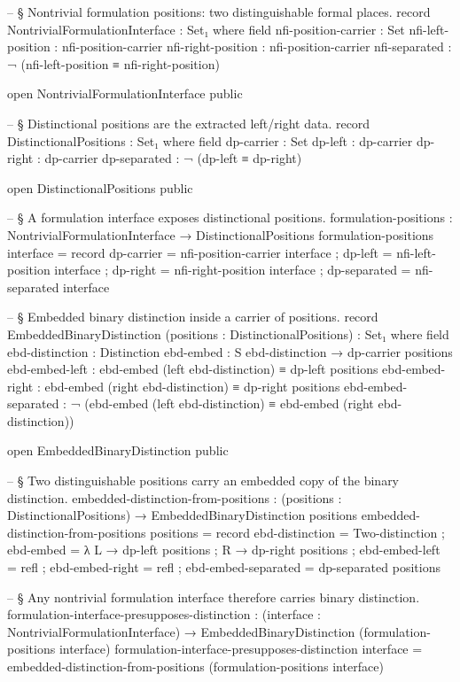 \documentclass[11pt]{article}
\begin{document}
\begin{code}
-- § Nontrivial formulation positions: two distinguishable formal places.
record NontrivialFormulationInterface : Set₁ where
  field
    nfi-position-carrier : Set
    nfi-left-position    : nfi-position-carrier
    nfi-right-position   : nfi-position-carrier
    nfi-separated        : ¬ (nfi-left-position ≡ nfi-right-position)

open NontrivialFormulationInterface public

-- § Distinctional positions are the extracted left/right data.
record DistinctionalPositions : Set₁ where
  field
    dp-carrier   : Set
    dp-left      : dp-carrier
    dp-right     : dp-carrier
    dp-separated : ¬ (dp-left ≡ dp-right)

open DistinctionalPositions public

-- § A formulation interface exposes distinctional positions.
formulation-positions : NontrivialFormulationInterface → DistinctionalPositions
formulation-positions interface = record
  { dp-carrier   = nfi-position-carrier interface
  ; dp-left      = nfi-left-position interface
  ; dp-right     = nfi-right-position interface
  ; dp-separated = nfi-separated interface
  }

-- § Embedded binary distinction inside a carrier of positions.
record EmbeddedBinaryDistinction (positions : DistinctionalPositions) : Set₁ where
  field
    ebd-distinction      : Distinction
    ebd-embed            : S ebd-distinction → dp-carrier positions
    ebd-embed-left       : ebd-embed (left ebd-distinction) ≡ dp-left positions
    ebd-embed-right      : ebd-embed (right ebd-distinction) ≡ dp-right positions
    ebd-embed-separated  :
      ¬ (ebd-embed (left ebd-distinction) ≡
         ebd-embed (right ebd-distinction))

open EmbeddedBinaryDistinction public

-- § Two distinguishable positions carry an embedded copy of the binary distinction.
embedded-distinction-from-positions :
  (positions : DistinctionalPositions) → EmbeddedBinaryDistinction positions
embedded-distinction-from-positions positions = record
  { ebd-distinction     = Two-distinction
  ; ebd-embed           = λ
      { L → dp-left positions
      ; R → dp-right positions
      }
  ; ebd-embed-left      = refl
  ; ebd-embed-right     = refl
  ; ebd-embed-separated = dp-separated positions
  }

-- § Any nontrivial formulation interface therefore carries binary distinction.
formulation-interface-presupposes-distinction :
  (interface : NontrivialFormulationInterface) →
  EmbeddedBinaryDistinction (formulation-positions interface)
formulation-interface-presupposes-distinction interface =
  embedded-distinction-from-positions (formulation-positions interface)


\end{code}
\end{document}
